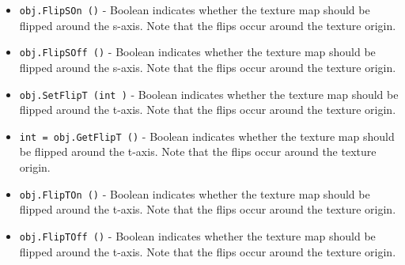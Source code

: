 \begin{itemize}
\item  \verb|obj.FlipSOn ()| -  Boolean indicates whether the texture map should be flipped around the 
 s-axis. Note that the flips occur around the texture origin.

\item  \verb|obj.FlipSOff ()| -  Boolean indicates whether the texture map should be flipped around the 
 s-axis. Note that the flips occur around the texture origin.

\item  \verb|obj.SetFlipT (int )| -  Boolean indicates whether the texture map should be flipped around the 
 t-axis. Note that the flips occur around the texture origin.

\item  \verb|int = obj.GetFlipT ()| -  Boolean indicates whether the texture map should be flipped around the 
 t-axis. Note that the flips occur around the texture origin.

\item  \verb|obj.FlipTOn ()| -  Boolean indicates whether the texture map should be flipped around the 
 t-axis. Note that the flips occur around the texture origin.

\item  \verb|obj.FlipTOff ()| -  Boolean indicates whether the texture map should be flipped around the 
 t-axis. Note that the flips occur around the texture origin.

\end{itemize}
